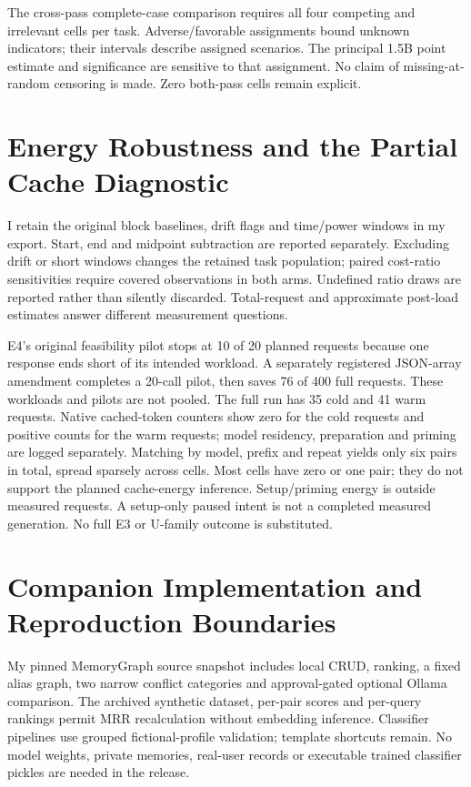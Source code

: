 \documentclass[10pt,a4paper,twocolumn]{article}
\begin{document}
The cross-pass complete-case comparison requires all four competing and
irrelevant cells per task. Adverse/favorable assignments bound unknown
indicators; their intervals describe assigned scenarios. The principal 1.5B
point estimate and significance are sensitive to that assignment. No claim of
missing-at-random censoring is made. Zero both-pass cells remain explicit.

\section{Energy Robustness and the Partial Cache Diagnostic}
I retain the original block baselines, drift flags and time/power windows in my
export. Start, end and midpoint subtraction are reported separately. Excluding
drift or short windows changes the retained task population; paired cost-ratio
sensitivities require covered observations in both arms. Undefined ratio draws
are reported rather than silently discarded. Total-request and approximate
post-load estimates answer different measurement questions.

E4's original feasibility pilot stops at 10 of 20 planned requests because one
response ends short of its intended workload. A separately registered JSON-array
amendment completes a 20-call pilot, then saves 76 of 400 full requests. These
workloads and pilots are not pooled. The full run has 35 cold and 41 warm
requests. Native cached-token counters show zero for the cold requests and
positive counts for the warm requests; model residency, preparation and priming
are logged separately. Matching by model, prefix and repeat yields only six
pairs in total, spread sparsely across cells. Most cells have zero or one pair;
they do not support the planned cache-energy inference. Setup/priming energy
is outside measured requests. A setup-only paused intent is not a completed
measured generation. No full E3 or U-family outcome is substituted.

\section{Companion Implementation and Reproduction Boundaries}
My pinned MemoryGraph source snapshot includes local CRUD, ranking, a fixed
alias graph, two narrow conflict categories and approval-gated optional Ollama
comparison. The archived synthetic dataset, per-pair scores and per-query
rankings permit MRR recalculation without embedding inference. Classifier
pipelines use grouped fictional-profile validation; template shortcuts remain.
No model weights, private memories, real-user records or executable trained
classifier pickles are needed in the release.
\end{document}
